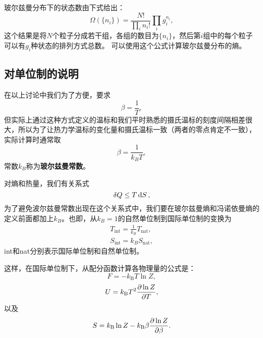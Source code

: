 \documentclass[hyperref, UTF8, a4paper]{ctexart}
\newcommand*{\ee}{\mathrm{e}}
\begin{document}
玻尔兹曼分布下的状态数由下式给出：
\[
    \Omega(\{n_i\}) = \frac{N!}{\prod_i n_i!} \prod_i g_i^{n_i},
\]
这个结果是将$N$个粒子分成若干组，各组的数目为$\{n_i\}$，然后第$i$组中的每个粒子可以有$g_i$种状态的排列方式总数。
可以使用这个公式计算玻尔兹曼分布的熵。


\subsection{对单位制的说明}

在以上讨论中我们为了方便，要求
\[
    \beta = \frac{1}{T},
\]
但实际上通过这种方式定义的温标和我们平时熟悉的摄氏温标的刻度间隔相差很大，所以为了让热力学温标的变化量和摄氏温标一致（两者的零点肯定不一致），实际计算时通常取
\begin{equation}
    \beta = \frac{1}{k_B T},
\end{equation}
常数$k_B$称为\textbf{玻尔兹曼常数}。

对熵和热量，我们有关系式
\[
    \var{Q} \leq T \dd{S},
\]
为了避免波尔兹曼常数出现在这个关系式中，我们要在玻尔兹曼熵和冯诺依曼熵的定义前面都加上$k_B$。也即，从$k_B=1$的自然单位制到国际单位制的变换为
\begin{equation}
    \begin{aligned}
        T_\text{int} = \frac{1}{k_B} T_\text{nat}, \\
        S_\text{int} = k_B S_\text{nat},
    \end{aligned}
\end{equation}
int和nat分别表示国际单位制和自然单位制。

这样，在国际单位制下，从配分函数计算各物理量的公式是：
\begin{equation}
    F = - k_\text{B} T \ln Z,
\end{equation}
\begin{equation}
    U = k_\text{B} T^2 \pdv{\ln Z}{T},
\end{equation}
以及
\begin{equation}
    S = k_\text{B} \ln Z - k_\text{B} \beta \pdv{\ln Z}{\beta}.
\end{equation}
\end{document}
